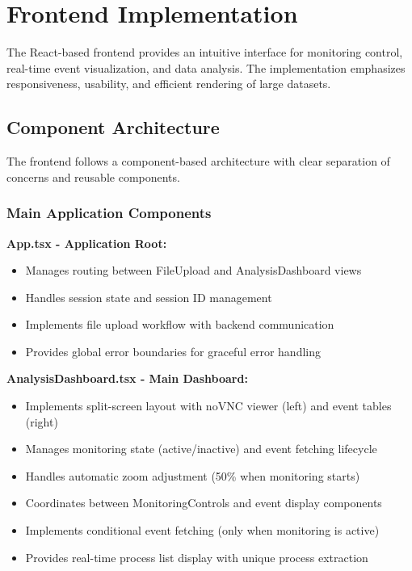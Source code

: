 \section{Frontend Implementation}

The React-based frontend provides an intuitive interface for monitoring control, real-time event visualization, and data analysis. The implementation emphasizes responsiveness, usability, and efficient rendering of large datasets.

\subsection{Component Architecture}

The frontend follows a component-based architecture with clear separation of concerns and reusable components.

\subsubsection{Main Application Components}

\textbf{App.tsx - Application Root:}
\begin{itemize}
    \item Manages routing between FileUpload and AnalysisDashboard views
    \item Handles session state and session ID management
    \item Implements file upload workflow with backend communication
    \item Provides global error boundaries for graceful error handling
\end{itemize}

\textbf{AnalysisDashboard.tsx - Main Dashboard:}
\begin{itemize}
    \item Implements split-screen layout with noVNC viewer (left) and event tables (right)
    \item Manages monitoring state (active/inactive) and event fetching lifecycle
    \item Handles automatic zoom adjustment (50\% when monitoring starts)
    \item Coordinates between MonitoringControls and event display components
    \item Implements conditional event fetching (only when monitoring is active)
    \item Provides real-time process list display with unique process extraction
\end{itemize}

